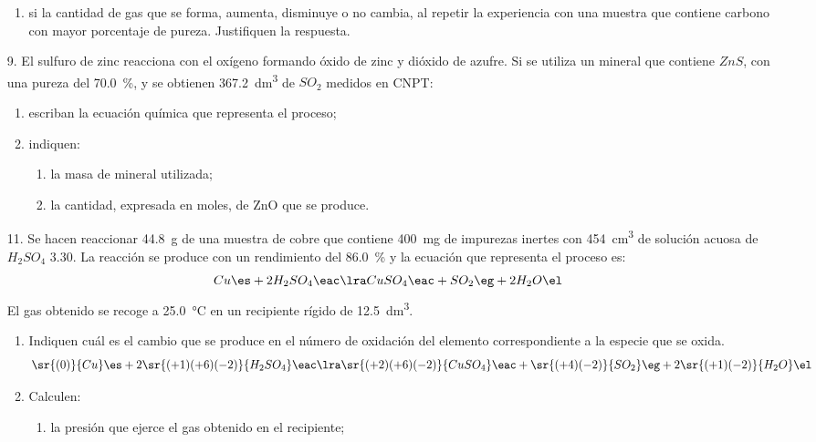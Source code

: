 \documentclass[../Práctica.root.tex]{subfiles}
\begin{document}
\begin{enumerate}
\begin{enumerate}
              \item si la cantidad de gas que se forma, aumenta, disminuye o no cambia,
                    al repetir la experiencia con una muestra que contiene carbono con mayor
                    porcentaje de pureza. Justifiquen la respuesta. \\
          \end{enumerate}


    \item[9.] El sulfuro de zinc reacciona con el oxígeno formando óxido de zinc y dióxido de azufre.
          Si se utiliza un mineral que contiene $ZnS$, con una pureza del \SI{70,0}{\percent}, y se obtienen
          \SI{367,2}{\dm\cubed} de $SO_2$ medidos en CNPT:
          \begin{enumerate}
              \item escriban la ecuación química que representa el proceso;
              \item indiquen:
                    \begin{enumerate}
                        \item la masa de mineral utilizada;
                        \item la cantidad, expresada en moles, de ZnO que se produce.
                    \end{enumerate}
          \end{enumerate}

    \item[11.] Se hacen reaccionar \SI{44,8}{\g} de una muestra de cobre que contiene \SI{400}{\mg} de impurezas
          inertes con \SI{454}{\cm\cubed} de solución acuosa de $H_2SO_4$ \SI{3,30}{\MR}. La reacción se produce con un
          rendimiento del \SI{86,0}{\percent} y la ecuación que representa el proceso es:
          \[ Cu \es + 2 H_2SO_4 \eac \lra CuSO_4 \eac + SO_2 \eg + 2 H_2O \el \]
          El gas obtenido se recoge a \SI{25,0}{\celsius} en un recipiente rígido de \SI{12,5}{\dm\cubed}.
          \begin{enumerate}
              \item Indiquen cuál es el cambio que se produce en el número de oxidación del elemento
                    correspondiente a la especie que se oxida.
                    \[ \sr{(0)}{Cu} \es + 2 \sr{(+1)(+6)(-2)}{H_2SO_4} \eac
                        \lra \sr{(+2)(+6)(-2)}{CuSO_4} \eac + \sr{(+4)(-2)}{SO_2} \eg + 2 \sr{(+1)(-2)}{H_2O} \el \]
              \item Calculen:
                    \begin{enumerate}[label=\roman*)]
                        \item la presión que ejerce el gas obtenido en el recipiente;


\end{enumerate}
\end{enumerate}
\end{enumerate}
\end{document}

